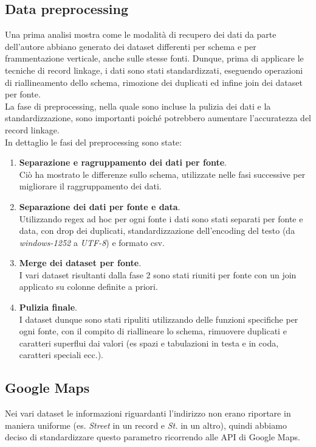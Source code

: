 \documentclass[a4paper,12pt]{article}
\begin{document}
\subsection{Data preprocessing} 
Una prima analisi mostra come le modalità di recupero dei dati da parte dell'autore abbiano generato dei dataset differenti per schema e per frammentazione verticale, anche sulle stesse fonti. Dunque, prima di applicare le tecniche di record linkage, i dati sono stati standardizzati, eseguendo operazioni di riallineamento dello schema, rimozione dei duplicati ed infine join dei dataset per fonte.\\
La fase di preprocessing, nella quale sono incluse la pulizia dei dati e la standardizzazione, sono importanti poiché potrebbero aumentare l'accuratezza del record linkage.\\
In dettaglio le fasi del preprocessing sono state: %
\begin{enumerate}
	\item \textbf{Separazione e ragruppamento dei dati per fonte}.\\Ciò ha mostrato le differenze sullo schema, utilizzate nelle fasi successive per migliorare il raggruppamento dei dati.
	\item \textbf{Separazione dei dati per fonte e data}.\\Utilizzando regex ad hoc per ogni fonte i dati sono stati separati per fonte e data, con drop dei duplicati, standardizzazione dell'encoding del testo (da \textit{windows-1252} a \textit{UTF-8}) e formato csv.
	\item \textbf{Merge dei dataset per fonte}.\\I vari dataset risultanti dalla fase 2 sono stati riuniti per fonte con un join applicato su colonne definite a priori. 
	\item \textbf{Pulizia finale}.\\I dataset dunque sono stati ripuliti utilizzando delle funzioni specifiche per ogni fonte, con il compito di riallineare lo schema, rimuovere duplicati e caratteri superflui dai valori (es spazi e tabulazioni in testa e in coda, caratteri speciali ecc.).  
\end{enumerate}

\subsection{Google Maps}
Nei vari dataset le informazioni riguardanti l'indirizzo non erano riportare in maniera uniforme (es. \textit{Street} in un record e \textit{St.} in un altro), quindi abbiamo deciso di standardizzare questo parametro ricorrendo alle API di Google Maps.
\end{document}
